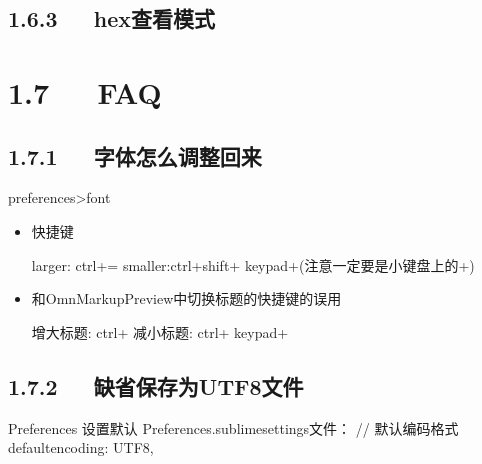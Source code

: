 \documentclass[letterpaper,12pt,english]{sphinxmanual}
\begin{document}
\subsection{1.6.3   hex查看模式}
\label{\detokenize{001software/001install/sublime:hex}}
\begin{sphinxVerbatim}[commandchars=\\\{\}]
    
  \PYGZbs{}\PYGZbs{}\PYGZbs{}\PYGZbs{}       
\end{sphinxVerbatim}


\section{1.7   FAQ}
\label{\detokenize{001software/001install/sublime:faq}}

\subsection{1.7.1   字体怎么调整回来}
\label{\detokenize{001software/001install/sublime:id6}}
preferences\sphinxhyphen{}>font
\begin{itemize}
\item {} 
快捷键

larger: ctrl+= smaller:ctrl+shift+ keypad+(注意一定要是小键盘上的+)

\item {} 
和OmnMarkupPreview中切换标题的快捷键的误用

增大标题: ctrl+ 减小标题: ctrl+ keypad+

\end{itemize}


\subsection{1.7.2   缺省保存为UTF8文件}
\label{\detokenize{001software/001install/sublime:utf8}}
\begin{sphinxVerbatim}[commandchars=\\\{\}]
Preferences 设置\PYGZhy{}默认
Preferences.sublime\PYGZhy{}settings文件：
// 默认编码格式
\PYGZdq{}default\PYGZus{}encoding\PYGZdq{}: \PYGZdq{}UTF\PYGZhy{}8\PYGZdq{},
\end{sphinxVerbatim}
\end{document}
